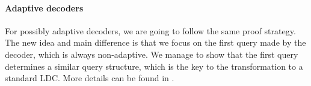 \documentclass[10pt,a4paper]{article}
\theoremstyle{remark}
\begin{document}

\paragraph{Adaptive decoders} For possibly adaptive decoders, we are going to follow the same proof strategy. The new idea and main difference is that we focus on the first query made by the decoder, which is always non-adaptive. We manage to show that the first query determines a similar query structure, which is the key to the transformation to a standard LDC. More details can be found in .
\end{document}
